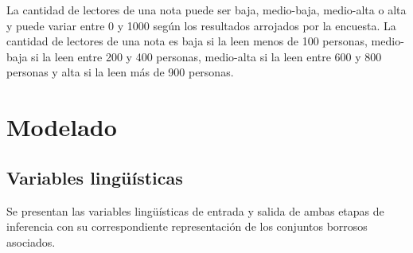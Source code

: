 \documentclass{article}
\begin{document}
La cantidad de lectores de una nota puede ser baja, medio-baja, medio-alta o alta y puede variar entre 0 y 1000 según los resultados arrojados por la encuesta. La cantidad de lectores de una nota es baja si la leen menos de 100 personas, medio-baja si la leen entre 200 y 400 personas, medio-alta si la leen entre 600 y 800 personas y alta si la leen más de 900 personas.
\fi

\section{Modelado}

\subsection{Variables lingüísticas}

Se presentan las variables lingüísticas de entrada y salida de ambas etapas de inferencia con su correspondiente representación de los conjuntos borrosos asociados.
\end{document}
